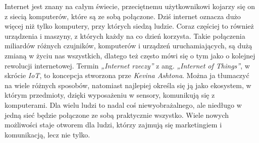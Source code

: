 \documentclass[brudnopis]{xmgr}
\begin{document}
\maketitle
\introduction

Internet jest znany na całym świecie, przeciętnemu użytkownikowi kojarzy się on z siecią komputerów, które są ze sobą połączone. Dziś internet oznacza dużo więcej niż tylko komputery, przy których siedzą ludzie. Coraz częściej to również urządzenia i maszyny, z których każdy na co dzień korzysta. Takie połączenia miliardów różnych czujników, komputerów i urządzeń uruchamiających, są dużą zmianą w życiu nas wszystkich, dlatego też często mówi się o tym jako o kolejnej rewolucji internetowej. 
Termin \emph{„Internet rzeczy”} z ang. \emph{„Internet of Things”}, w skrócie \emph{IoT}, to koncepcja stworzona prze \emph{Kevina Ashtona}. Można ja tłumaczyć na wiele różnych sposobów, natomiast najlepiej określa się ją jako ekosystem, w którym przedmioty, dzięki wyposażeniu w sensory, komunikują się z komputerami. Dla wielu ludzi to nadal coś niewyobrażalnego, ale niedługo w jedną sieć będzie połączone ze sobą praktycznie wszystko. Wiele nowych możliwości staje otworem dla ludzi, którzy zajmują się marketingiem i komunikacją, lecz nie tylko. 
\end{document}
